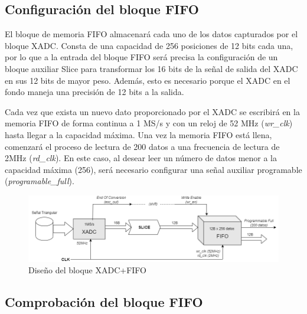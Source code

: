 \subsection{Configuración del bloque FIFO}

El bloque de memoria FIFO almacenará cada uno de los datos capturados por el bloque XADC. Consta de una capacidad de 256 posiciones de 12 bits cada una, por lo que a la entrada del bloque FIFO será precisa la configuración de un bloque auxiliar Slice para transformar los 16 bits de la señal de salida del XADC en sus 12 bits de mayor peso. Además, esto es necesario porque el XADC en el fondo maneja una precisión de 12 bits a la salida. 

Cada vez que exista un nuevo dato proporcionado por el XADC se escribirá en la memoria FIFO de forma continua a 1 MS/s y con un reloj de 52 MHz (\textit{wr\_clk}) hasta llegar a la capacidad máxima. Una vez la memoria FIFO está llena, comenzará el proceso de lectura de 200 datos a una frecuencia de lectura de 2MHz (\textit{rd\_clk}). En este caso, al desear leer un número de datos menor a la capacidad máxima (256), será necesario configurar una señal auxiliar programable (\textit{programable\_full}).

\vspace{3mm}

    \begin{figure}[h]
    	\centering
    	\includegraphics[width=1\textwidth]{img/diseno/xadc_fifo.drawio.PNG}
    	\caption{Diseño del bloque XADC+FIFO}
    	\label{fig:xadc_fifo}
    \end{figure}
    
\vspace{3mm}

\subsection{Comprobación del bloque FIFO}

      
